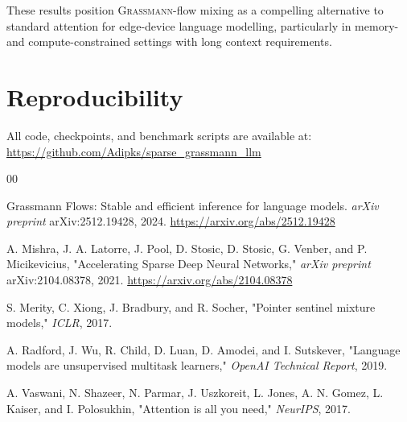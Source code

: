 \documentclass[conference]{IEEEtran}
\newcommand{\grassmann}{\textsc{Grassmann}}
\begin{document}
These results position \grassmann{}-flow mixing as a compelling
alternative to standard attention for edge-device language modelling,
particularly in memory- and compute-constrained settings with long
context requirements.


\section{Reproducibility}
\label{sec:repro}

All code, checkpoints, and benchmark scripts are available at:\\
\url{https://github.com/Adipks/sparse_grassmann_llm}




\begin{thebibliography}{00}
\normalsize

Grassmann Flows: Stable and efficient inference for language models. \textit{arXiv preprint} arXiv:2512.19428, 2024. \url{https://arxiv.org/abs/2512.19428}

A. Mishra, J. A. Latorre, J. Pool, D. Stosic, D. Stosic, G. Venber, and P. Micikevicius, "Accelerating Sparse Deep Neural Networks," \textit{arXiv preprint} arXiv:2104.08378, 2021. \url{https://arxiv.org/abs/2104.08378}

S. Merity, C. Xiong, J. Bradbury, and R. Socher, "Pointer sentinel mixture models," \textit{ICLR}, 2017.

A. Radford, J. Wu, R. Child, D. Luan, D. Amodei, and I. Sutskever, "Language models are unsupervised multitask learners," \textit{OpenAI Technical Report}, 2019.

A. Vaswani, N. Shazeer, N. Parmar, J. Uszkoreit, L. Jones, A. N. Gomez, L. Kaiser, and I. Polosukhin, "Attention is all you need," \textit{NeurIPS}, 2017.

\end{thebibliography}
\end{document}
